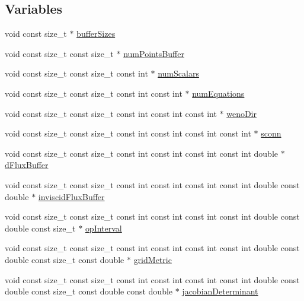 \subsection*{Variables}
\begin{DoxyCompactItemize}
\item 
void const size\+\_\+t $\ast$ \hyperlink{WENOKernels_8H_a302023d425dc22c2c647b4f9d8c78b0b}{buffer\+Sizes}
\item 
void const size\+\_\+t const size\+\_\+t $\ast$ \hyperlink{WENOKernels_8H_a86c25ff33e6d9bccfabdf45dc5ddf24c}{num\+Points\+Buffer}
\item 
void const size\+\_\+t const size\+\_\+t const int $\ast$ \hyperlink{WENOKernels_8H_a653618c9ce0046e8ef3b30321ea41f98}{num\+Scalars}
\item 
void const size\+\_\+t const size\+\_\+t const int const int $\ast$ \hyperlink{WENOKernels_8H_a118b6c5063941671714ad42ce6ccf62e}{num\+Equations}
\item 
void const size\+\_\+t const size\+\_\+t const int const int const int $\ast$ \hyperlink{WENOKernels_8H_ad666ee82e2a1fc16c063480c239ae188}{weno\+Dir}
\item 
void const size\+\_\+t const size\+\_\+t const int const int const int const int $\ast$ \hyperlink{WENOKernels_8H_a84323f7f31a8db8ca9cb6ffd45f53a8a}{sconn}
\item 
void const size\+\_\+t const size\+\_\+t const int const int const int const int double $\ast$ \hyperlink{WENOKernels_8H_a2d1f37d2aa66a6c55c41d8f4d340ad1b}{d\+Flux\+Buffer}
\item 
void const size\+\_\+t const size\+\_\+t const int const int const int const int double const double $\ast$ \hyperlink{WENOKernels_8H_a263d06ceac785fb9ccc396be5508a5d6}{inviscid\+Flux\+Buffer}
\item 
void const size\+\_\+t const size\+\_\+t const int const int const int const int double const double const size\+\_\+t $\ast$ \hyperlink{WENOKernels_8H_a23d86f4608a92738225f87574392b273}{op\+Interval}
\item 
void const size\+\_\+t const size\+\_\+t const int const int const int const int double const double const size\+\_\+t const double $\ast$ \hyperlink{WENOKernels_8H_a901f07fa4e3f966a2f6951d6c5974e89}{grid\+Metric}
\item 
void const size\+\_\+t const size\+\_\+t const int const int const int const int double const double const size\+\_\+t const double const double $\ast$ \hyperlink{WENOKernels_8H_a683cd3089fd3d704d36a88a01154d7a7}{jacobian\+Determinant}

\end{DoxyCompactItemize}
